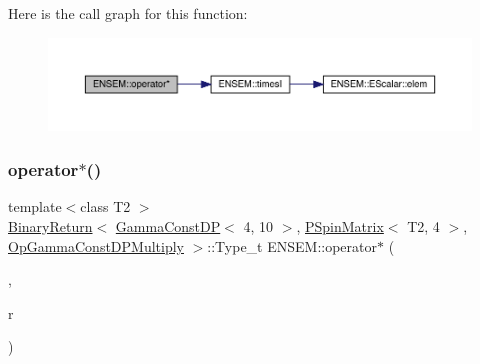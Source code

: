 Here is the call graph for this function\+:\nopagebreak
\begin{figure}[H]
\begin{center}
\leavevmode
\includegraphics[width=350pt]{d6/df5/group__primspinmatrix_gab9e77cb7fcc24e0d8f81fc43b3274d5d_cgraph}
\end{center}
\end{figure}
\mbox{\label{group__primspinmatrix_gad3aa1e55d31246f4c4f0a15456a84fea}} 
\subsubsection{\texorpdfstring{operator$\ast$()}{operator*()}\hspace{0.1cm}{\footnotesize\ttfamily [43/64]}}
{\footnotesize\ttfamily template$<$class T2 $>$ \\
\mbox{\hyperlink{structENSEM_1_1BinaryReturn}{Binary\+Return}}$<$ \mbox{\hyperlink{classENSEM_1_1GammaConstDP}{Gamma\+Const\+DP}}$<$ 4, 10 $>$, \mbox{\hyperlink{classENSEM_1_1PSpinMatrix}{P\+Spin\+Matrix}}$<$ T2, 4 $>$, \mbox{\hyperlink{structENSEM_1_1OpGammaConstDPMultiply}{Op\+Gamma\+Const\+D\+P\+Multiply}} $>$\+::Type\+\_\+t E\+N\+S\+E\+M\+::operator$\ast$ (\begin{DoxyParamCaption}\item[{const \mbox{\hyperlink{classENSEM_1_1GammaConstDP}{Gamma\+Const\+DP}}$<$ 4, 10 $>$ \&}]{,  }\item[{const \mbox{\hyperlink{classENSEM_1_1PSpinMatrix}{P\+Spin\+Matrix}}$<$ T2, 4 $>$ \&}]{r }\end{DoxyParamCaption})\hspace{0.3cm}{\ttfamily [inline]}}

\mbox{\label{group__primspinmatrix_ga763e216e29f923dec37a54603419bb2c}} 

